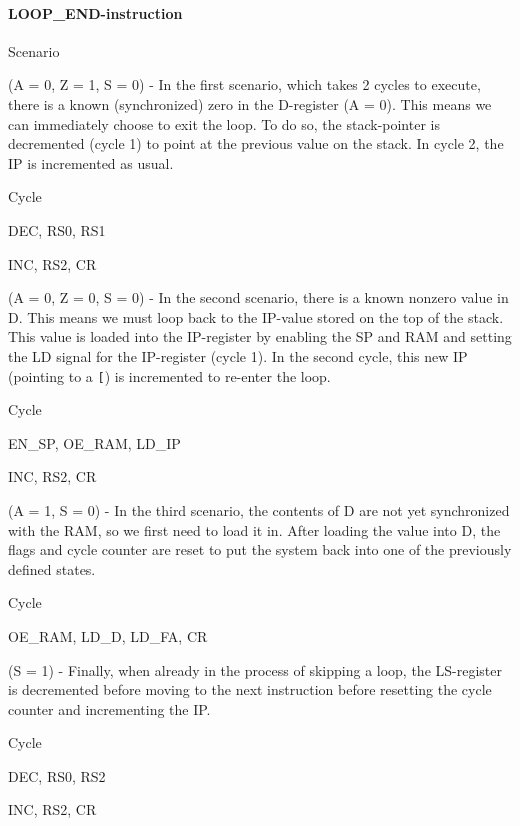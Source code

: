   \paragraph{LOOP\_END-instruction}
  \begin{labeledenum}{Scenario}
  \item (A = 0, Z = 1, S = 0) - In the first scenario, which takes 2 cycles to execute, there is a known (synchronized) zero in the D-register (A = 0). This means we can immediately choose to exit the loop. To do so, the stack-pointer is decremented (cycle 1) to point at the previous value on the stack. In cycle 2, the IP is incremented as usual.
    
    \begin{labeledenum}{Cycle}
    \item DEC, RS0, RS1  
    \item INC, RS2, CR
    \end{labeledenum}

  \item (A = 0, Z = 0, S = 0) - In the second scenario, there is a known nonzero value in D. This means we must loop back to the IP-value stored on the top of the stack. This value is loaded into the IP-register by enabling the SP and RAM and setting the LD signal for the IP-register (cycle 1). In the second cycle, this new IP (pointing to a \texttt{[}) is incremented to re-enter the loop.
    
      \begin{labeledenum}{Cycle}
      \item EN\_SP, OE\_RAM, LD\_IP
      \item INC, RS2, CR
      \end{labeledenum}
      
    \item (A = 1, S = 0) - In the third scenario, the contents of D are not yet synchronized with the RAM, so we first need to load it in. After loading the value into D, the flags and cycle counter are reset to put the system back into one of the previously defined states.

      \begin{labeledenum}{Cycle}
      \item OE\_RAM, LD\_D, LD\_FA, CR
      \end{labeledenum}
      
    \item (S = 1) - Finally, when already in the process of skipping a loop, the LS-register is decremented before moving to the next instruction before resetting the cycle counter and incrementing the IP.
      
      \begin{labeledenum}{Cycle}
      \item DEC, RS0, RS2
      \item INC, RS2, CR
      \end{labeledenum}
  \end{labeledenum}

